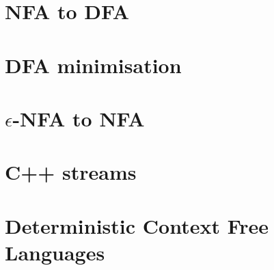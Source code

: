 \documentclass[a4paper,12pt]{article}
\begin{document}
\section{NFA to DFA}

\section{DFA minimisation}

\section{\(\epsilon\)-NFA to NFA}

\section{C++ streams}
\section{Deterministic Context Free Languages}
\end{document}
